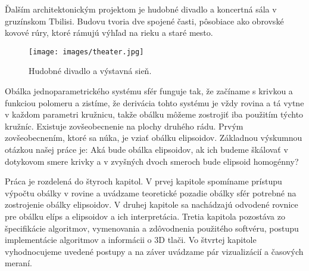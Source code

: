 Ďalším architektonickým projektom je hudobné divadlo a koncertná sála v gruzínskom Tbilisi. Budovu tvoria dve spojené časti, pôsobiace ako obrovské kovové rúry, ktoré rámujú výhľad na rieku a staré mesto.

\begin{figure}[h!]
	\centering
	\texttt{[image: images/theater.jpg]}
	\caption[Hudobné divadlo a výstavná sieň.]{Hudobné divadlo a výstavná sieň. \cite{MusicTheater}}
	\label{fig:theater}
\end{figure}

Obálka jednoparametrického systému sfér funguje tak, že začíname s krivkou a funkciou polomeru a zistíme, že derivácia tohto systému je vždy rovina a tá vytne v každom parametri kružnicu, takže obálku môžeme zostrojiť iba použitím týchto kružníc. Existuje zovšeobecnenie na plochy druhého rádu. Prvým zovšeobecnením, ktoré sa núka, je vziať obálku elipsoidov. Základnou výskumnou otázkou našej práce je: Aká bude obálka elipsoidov, ak ich budeme škálovať v dotykovom smere krivky a v zvyšných dvoch smeroch bude elipsoid homogénny?

Práca je rozdelená do štyroch kapitol. V prvej kapitole spomíname prístupu výpočtu obálky v rovine a uvádzame teoretické pozadie obálky sfér potrebné na zostrojenie obálky elipsoidov. V druhej kapitole sa nachádzajú odvodené rovnice pre obálku elíps a elipsoidov a ich interpretácia. Tretia kapitola pozostáva zo špecifikácie algoritmov, vymenovania a zdôvodnenia použitého softvéru, postupu implementácie algoritmov a informácii o 3D tlači. Vo štvrtej kapitole vyhodnocujeme uvedené postupy a na záver uvádzame pár vizualizácií a časových meraní.